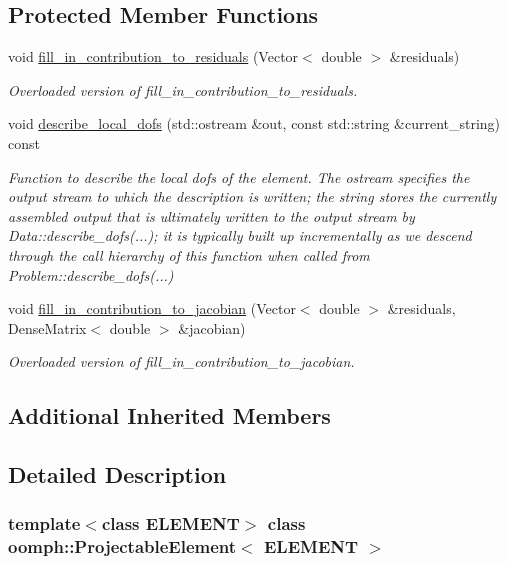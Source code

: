 \subsection*{Protected Member Functions}
\begin{DoxyCompactItemize}
\item 
void \hyperlink{classoomph_1_1ProjectableElement_aeb0de899b7a5c7f498b2206ab00ef786}{fill\+\_\+in\+\_\+contribution\+\_\+to\+\_\+residuals} (Vector$<$ double $>$ \&residuals)
\begin{DoxyCompactList}\small\item\em Overloaded version of fill\+\_\+in\+\_\+contribution\+\_\+to\+\_\+residuals. \end{DoxyCompactList}\item 
void \hyperlink{classoomph_1_1ProjectableElement_a9e7e6d213f5e28d4b1e91433d4efb74c}{describe\+\_\+local\+\_\+dofs} (std\+::ostream \&out, const std\+::string \&current\+\_\+string) const
\begin{DoxyCompactList}\small\item\em Function to describe the local dofs of the element. The ostream specifies the output stream to which the description is written; the string stores the currently assembled output that is ultimately written to the output stream by Data\+::describe\+\_\+dofs(...); it is typically built up incrementally as we descend through the call hierarchy of this function when called from Problem\+::describe\+\_\+dofs(...) \end{DoxyCompactList}\item 
void \hyperlink{classoomph_1_1ProjectableElement_a5b6894eda403bd2b9d2cf1e0314d7a23}{fill\+\_\+in\+\_\+contribution\+\_\+to\+\_\+jacobian} (Vector$<$ double $>$ \&residuals, Dense\+Matrix$<$ double $>$ \&jacobian)
\begin{DoxyCompactList}\small\item\em Overloaded version of fill\+\_\+in\+\_\+contribution\+\_\+to\+\_\+jacobian. \end{DoxyCompactList}\end{DoxyCompactItemize}
\subsection*{Additional Inherited Members}


\subsection{Detailed Description}
\subsubsection*{template$<$class E\+L\+E\+M\+E\+NT$>$\newline
class oomph\+::\+Projectable\+Element$<$ E\+L\+E\+M\+E\+N\+T $>$}

